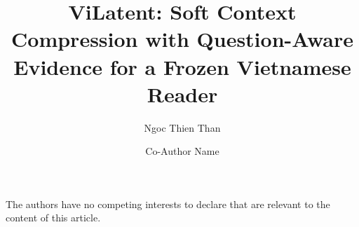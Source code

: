 \documentclass[runningheads,a4paper]{llncs}
\newif\ifdraft
\newcommand{\todo}[1]{\ifdraft{\color{red}\footnotesize[TODO: #1]}\else
  \PackageError{main}{a TODO note is left}{Resolve it}\fi}
\begin{document}
\title{ViLatent: Soft Context Compression with Question-Aware Evidence for a Frozen Vietnamese Reader}

\author{Ngoc Thien Than \and
Co-Author Name}

\maketitle









\begin{credits}
\subsubsection{\ackname}
\todo{GPU provider, funding, the operators who ran the experiments.}

\subsubsection{\discintname}
The authors have no competing interests to declare that are relevant to the content of this article.
\end{credits}



\end{document}
